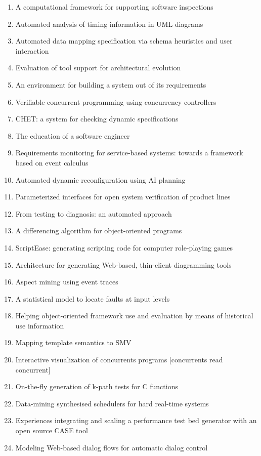 \begin{enumerate}[itemsep=-1ex]
  \item A computational framework for supporting software inspections
  \item Automated analysis of timing information in UML diagrams
  \item Automated data mapping specification via schema heuristics and user interaction
  \item Evaluation of tool support for architectural evolution
  \item An environment for building a system out of its requirements
  \item Verifiable concurrent programming using concurrency controllers
  \item CHET: a system for checking dynamic specifications
  \item The education of a software engineer
  \item Requirements monitoring for service-based systems: towards a framework based on event calculus
  \item Automated dynamic reconfiguration using AI planning
  \item Parameterized interfaces for open system verification of product lines
  \item From testing to diagnosis: an automated approach
  \item A differencing algorithm for object-oriented programs
  \item ScriptEase: generating scripting code for computer role-playing games
  \item Architecture for generating Web-based, thin-client diagramming tools
  \item Aspect mining using event traces
  \item A statistical model to locate faults at input levels
  \item Helping object-oriented framework use and evaluation by means of historical use information
  \item Mapping template semantics to SMV
  \item Interactive visualization of concurrents programs [concurrents read concurrent]
  \item On-the-fly generation of k-path tests for C functions
  \item Data-mining synthesised schedulers for hard real-time systems
  \item Experiences integrating and scaling a performance test bed generator with an open source CASE tool
  \item Modeling Web-based dialog flows for automatic dialog control

\end{enumerate}

